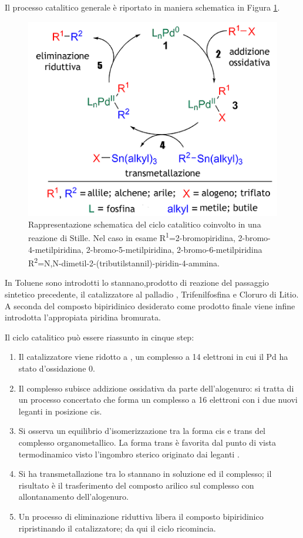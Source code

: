 \documentclass[a4paper, 12pt]{article}
\begin{document}
Il processo catalitico generale è riportato in maniera schematica in Figura \ref{fig:stille}.

\begin{figure}[H]
	\centering
	\includegraphics[width=.9\linewidth]{immagini/stille.png}
	\caption{Rappresentazione schematica del ciclo catalitico coinvolto in una reazione di Stille. Nel caso in esame R\textsuperscript{1}=2-bromopiridina, 2-bromo-4-metilpiridina, 2-bromo-5-metilpiridina, 2-bromo-6-metilpiridina R\textsuperscript{2}=N,N-dimetil-2-(tributilstannil)-piridin-4-ammina.}
	\label{fig:stille}
\end{figure}

In Toluene sono introdotti lo stannano,prodotto di reazione del passaggio sintetico precedente, il catalizzatore al palladio , Trifenilfosfina e Cloruro di Litio. A seconda del composto bipiridinico desiderato come prodotto finale viene infine introdotta l'appropiata piridina bromurata.

Il ciclo catalitico può essere riassunto in cinque step:
\begin{enumerate}
	\item Il catalizzatore  viene ridotto a , un complesso a 14 elettroni in cui il Pd ha stato d'ossidazione 0.
	\item Il complesso subisce addizione ossidativa da parte dell'alogenuro: si tratta di un processo concertato che forma un complesso a 16 elettroni con i due nuovi leganti in posizione cis.
	\item Si osserva un equilibrio d'isomerizzazione tra la forma cis e trans del complesso organometallico. La forma trans è favorita dal punto di vista termodinamico visto l'ingombro sterico originato dai leganti .
	\item Si ha transmetallazione tra lo stannano in soluzione ed il complesso; il risultato è il trasferimento del composto arilico sul complesso con allontanamento dell'alogenuro.
	\item Un processo di eliminazione riduttiva libera il composto bipiridinico ripristinando il catalizzatore; da qui il ciclo ricomincia.
\end{enumerate}
\end{document}
